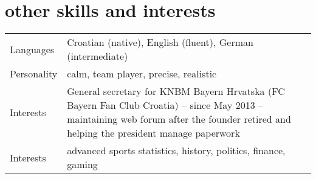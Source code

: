 \documentclass[a4paper]{article}
\makeatletter
\newlength{\tablewidth}
\newenvironment{skills}{%
\setlength{\tablewidth}{\linewidth}
\addtolength{\tablewidth}{-2\tabcolsep}
\begin{tabular}{@{}p{0.15\tablewidth}p{0.85\tablewidth}@{}}
}{%
\end{tabular}
}
\makeatother
\begin{document}
\section{other skills and interests}
\begin{skills}
	Languages & Croatian (native), English (fluent), German (intermediate) \\
	Personality & calm, team player, precise, realistic \\
	Interests & General secretary for KNBM Bayern Hrvatska (FC Bayern Fan Club Croatia) -- since May 2013 -- maintaining web forum after the founder retired and helping the president manage paperwork \\
	Interests & advanced sports statistics, history, politics, finance, gaming \\
\end{skills}
\end{document}
